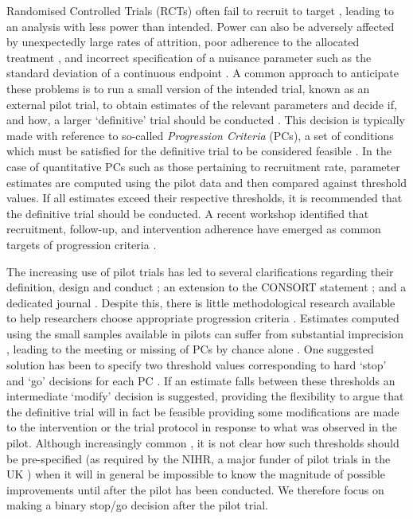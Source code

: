 \documentclass[AMA,STIX1COL]{WileyNJD-v2}
\begin{document}
Randomised Controlled Trials (RCTs) often fail to recruit to target \cite{Sully2013}, leading to an analysis with less power than intended. Power can also be adversely affected by unexpectedly large rates of attrition, poor adherence to the allocated treatment \cite{Fay2006}, and incorrect specification of a nuisance parameter such as the standard deviation of a continuous endpoint \cite{Teare2014}. A common approach to anticipate these problems is to run a small version of the intended trial, known as an external pilot trial, to obtain estimates of the relevant parameters and decide if, and how, a larger `definitive' trial should be conducted  \cite{Eldridge2016}. This decision is typically made with reference to so-called \emph{Progression Criteria} (PCs), a set of conditions which must be satisfied for the definitive trial to be considered feasible \cite{Avery2017}. In the case of quantitative PCs such as those pertaining to recruitment rate, parameter estimates are computed using the pilot data and then compared against threshold values. If all estimates exceed their respective thresholds, it is recommended that the definitive trial should be conducted. A recent workshop identified that recruitment, follow-up, and intervention adherence have emerged as common targets of progression criteria \cite{Avery2017}. 

The increasing use of pilot trials has led to several clarifications regarding their definition, design and conduct \cite{Lancaster2004, Craig2008, Arain2010, Thabane2010, Eldridge2016}; an extension to the CONSORT statement \cite{Eldridge2016a}; and a dedicated journal \cite{Lancaster2015}. Despite this, there is little methodological research available to help researchers choose appropriate progression criteria \cite{Avery2017}. Estimates computed using the small samples available in pilots can suffer from substantial imprecision \cite{Cooper2018}, leading to the meeting or missing of PCs by chance alone \cite{Eldridge2015}. One suggested solution has been to specify two threshold values corresponding to hard `stop' and `go' decisions for each PC \cite{Avery2017}. If an estimate falls between these thresholds an intermediate `modify' decision is suggested, providing the flexibility to argue that the definitive trial will in fact be feasible providing some modifications are made to the intervention or the trial protocol in response to what was observed in the pilot. Although increasingly common \cite{Eldridge2016a}, it is not clear how such thresholds should be pre-specified (as required by the NIHR, a major funder of pilot trials in the UK \cite{NIHR2017}) when it will in general be impossible to know the magnitude of possible improvements until after the pilot has been conducted. We therefore focus on making a binary stop/go decision after the pilot trial.
\end{document}
